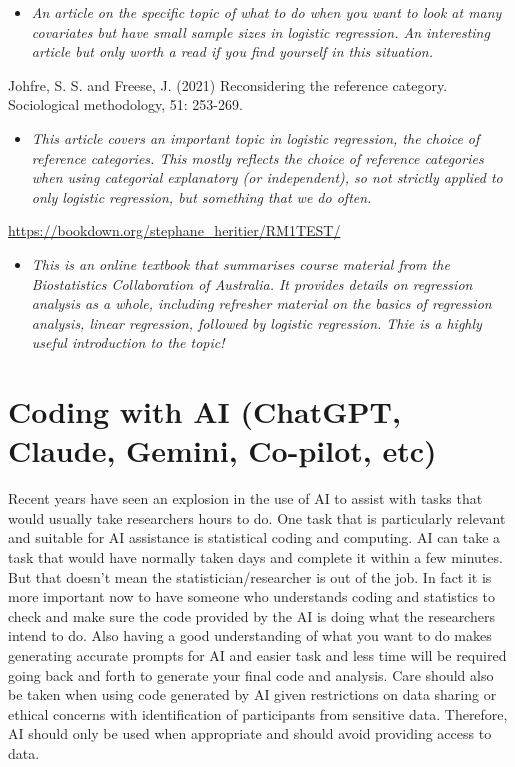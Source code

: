 \documentclass[
]{book}
\providecommand{\tightlist}{%
  \setlength{\itemsep}{0pt}\setlength{\parskip}{0pt}}
\begin{document}
\begin{itemize}
\tightlist
\item
  \emph{An article on the specific topic of what to do when you want to look at many covariates but have small sample sizes in logistic regression. An interesting article but only worth a read if you find yourself in this situation.}
\end{itemize}

Johfre, S. S. and Freese, J. (2021) Reconsidering the reference category. Sociological methodology, 51: 253-269.

\begin{itemize}
\tightlist
\item
  \emph{This article covers an important topic in logistic regression, the choice of reference categories. This mostly reflects the choice of reference categories when using categorial explanatory (or independent), so not strictly applied to only logistic regression, but something that we do often.}
\end{itemize}

\url{https://bookdown.org/stephane_heritier/RM1TEST/}

\begin{itemize}
\tightlist
\item
  \emph{This is an online textbook that summarises course material from the Biostatistics Collaboration of Australia. It provides details on regression analysis as a whole, including refresher material on the basics of regression analysis, linear regression, followed by logistic regression. Thie is a highly useful introduction to the topic!}
\end{itemize}

\chapter{Coding with AI (ChatGPT, Claude, Gemini, Co-pilot, etc)}\label{coding-with-ai-chatgpt-claude-gemini-co-pilot-etc}

Recent years have seen an explosion in the use of AI to assist with tasks that would usually take researchers hours to do. One task that is particularly relevant and suitable for AI assistance is statistical coding and computing. AI can take a task that would have normally taken days and complete it within a few minutes. But that doesn't mean the statistician/researcher is out of the job. In fact it is more important now to have someone who understands coding and statistics to check and make sure the code provided by the AI is doing what the researchers intend to do. Also having a good understanding of what you want to do makes generating accurate prompts for AI and easier task and less time will be required going back and forth to generate your final code and analysis. Care should also be taken when using code generated by AI given restrictions on data sharing or ethical concerns with identification of participants from sensitive data. Therefore, AI should only be used when appropriate and should avoid providing access to data.
\end{document}
